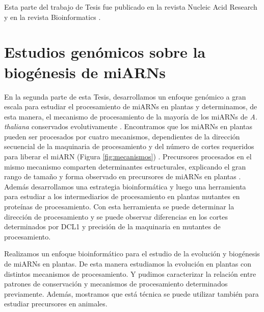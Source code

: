 Esta parte del trabajo de Tesis fue publicado en la revista Nucleic Acid Research \citep{Chorostecki05072012} y en la revista Bioinformatics \citep{Chorostecki2014}.



\section{Estudios genómicos sobre la biogénesis de miARNs}

En la segunda parte de esta Tesis, desarrollamos un enfoque genómico a gran escala para estudiar el procesamiento de miARNs en plantas y determinamos, de esta manera, el mecanismo de procesamiento de la mayoría de los miARNs de \textit{A. thaliana} conservados evolutivamente \citep{Bologna2013}.
Encontramos que los miARNs en plantas pueden ser procesados por cuatro mecanismos, dependientes de la dirección secuencial de la maquinaria de procesamiento y del número de cortes requeridos para liberar el miARN (Figura \ref{fig:mecanismos}) \citep{Bologna2013}.
Precursores procesados en el mismo mecanismo comparten determinantes estructurales, explicando el gran rango de tamaño y forma observado en precursores de miARNs en plantas \citep{Bologna2013}.
Además desarrollamos una estrategia bioinformática y luego una herramienta para estudiar a los intermediarios de procesamiento en plantas mutantes en proteínas de procesamiento.
Con esta herramienta se puede determinar la dirección de procesamiento y se puede observar diferencias en los cortes determinados por DCL1 y precisión de la maquinaria en mutantes de procesamiento.

Realizamos un  enfoque bioinformático para el estudio de la evolución y biogénesis de miARNs en plantas.
De esta manera estudiamos la evolución en plantas con distintos mecanismos de procesamiento.
Y pudimos caracterizar la relación entre patrones de conservación y mecanismos de procesamiento determinados previamente. 
Además, mostramos que está técnica se puede utilizar también para estudiar precursores en animales.


